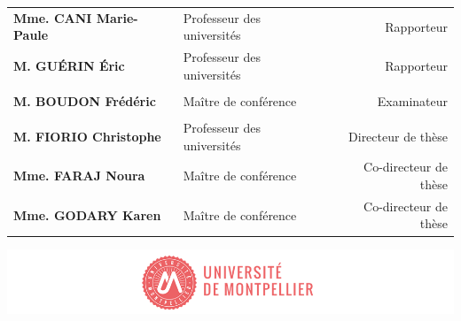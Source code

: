 \begin{titlepage}
{\begin{tabularx}{\textwidth}{l X r}
			\textbf{Mme. CANI Marie-Paule} & Professeur des universités & Rapporteur \\
			\textbf{M. GUÉRIN Éric} & Professeur des universités & Rapporteur \\
			\\
			\textbf{M. BOUDON Frédéric} & Maître de conférence & Examinateur \\
			\\
			\textbf{M. FIORIO Christophe} & Professeur des universités & Directeur de thèse \\
			\textbf{Mme. FARAJ Noura} & Maître de conférence & Co-directeur de thèse \\
			\textbf{Mme. GODARY Karen} & Maître de conférence & Co-directeur de thèse
		\end{tabularx} 
		
		\vspace{\fill}
		\includegraphics[scale=1]{images/PhD_Couverture_LogoUM.png}
		\vspace{-15mm}}
\end{titlepage}

